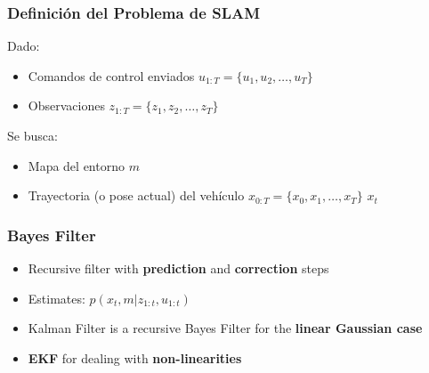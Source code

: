 \begin{frame}
    \frametitle{Definición del Problema de SLAM}

    Dado:
    \begin{itemize}
        \item Comandos de control enviados $u_{1:T} = \{u_1, u_2, \ldots, u_T\}$
        \item Observaciones $z_{1:T} = \{z_1, z_2, \ldots, z_T\}$
    \end{itemize}

    Se busca:
    \begin{itemize}
        \item Mapa del entorno $m$
        \item Trayectoria (o pose actual) del vehículo $x_{0:T} = \{x_0, x_1, \ldots, x_T\}$ $x_{t}$
    \end{itemize}
\end{frame}

\begin{frame}
    \frametitle{Bayes Filter}

    \begin{itemize}
        \item Recursive filter with \textbf{prediction} and \textbf{correction} steps
        \item Estimates: $p(x_t, m | z_{1:t}, u_{1:t})$
        \item Kalman Filter is a recursive Bayes Filter for the \textbf{linear Gaussian case}
        \item \textbf{EKF} for dealing with \textbf{non-linearities}
    \end{itemize}
\end{frame}

